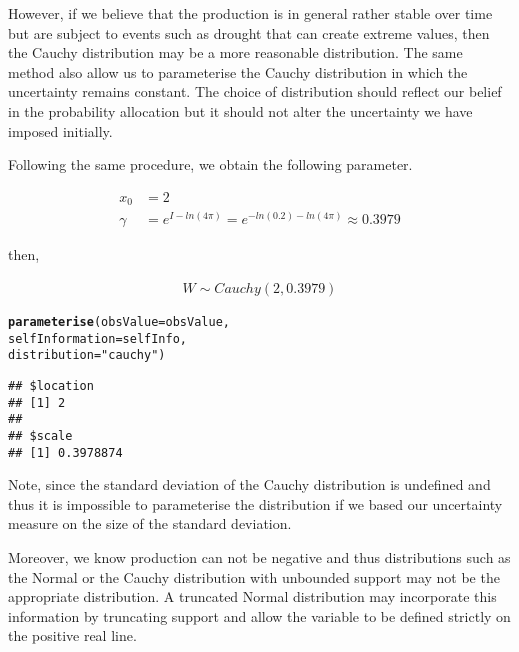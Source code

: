 \documentclass[nojss]{jss}\usepackage[]{graphicx}\usepackage[]{color}
\makeatletter
\newcommand{\hlstr}[1]{\textcolor[rgb]{0.192,0.494,0.8}{#1}}%
\newcommand{\hlstd}[1]{\textcolor[rgb]{0.345,0.345,0.345}{#1}}%
\newcommand{\hlkwc}[1]{\textcolor[rgb]{0.333,0.667,0.333}{#1}}%
\newcommand{\hlkwd}[1]{\textcolor[rgb]{0.737,0.353,0.396}{\textbf{#1}}}%
\newenvironment{kframe}{%
 \def\at@end@of@kframe{}%
 \ifinner\ifhmode%
  \def\at@end@of@kframe{\end{minipage}}%
  \begin{minipage}{\columnwidth}%
 \fi\fi%
 \def\FrameCommand##1{\hskip\@totalleftmargin \hskip-\fboxsep
 \colorbox{shadecolor}{##1}\hskip-\fboxsep
     \hskip-\linewidth \hskip-\@totalleftmargin \hskip\columnwidth}%
 \MakeFramed {\advance\hsize-\width
   \@totalleftmargin\z@ \linewidth\hsize
   \@setminipage}}%
 {\par\unskip\endMakeFramed%
 \at@end@of@kframe}
\newenvironment{knitrout}{}{} %
\makeatother
\begin{document}
However, if we believe that the production is in general rather stable
over time but are subject to events such as drought that can create
extreme values, then the Cauchy distribution may be a more reasonable
distribution. The same method also allow us to parameterise the Cauchy
distribution in which the uncertainty remains constant. The choice of
distribution should reflect our belief in the probability allocation
but it should not alter the uncertainty we have imposed initially.

Following the same procedure, we obtain the following parameter.


\begin{align}
  x_0 &= 2\nonumber\\ 
  \gamma &= e^{I - ln(4\pi)} = e^{-ln(0.2) - ln(4\pi)} \approx 0.3979\nonumber
\end{align}

then,

\begin{align}
  W \sim Cauchy(2, 0.3979)\nonumber
\end{align}



\begin{knitrout}
\color{fgcolor}\begin{kframe}
\begin{alltt}
\hlkwd{parameterise}\hlstd{(}\hlkwc{obsValue} \hlstd{= obsValue,}
             \hlkwc{selfInformation} \hlstd{= selfInfo,}
             \hlkwc{distribution} \hlstd{=} \hlstr{"cauchy"}\hlstd{)}
\end{alltt}
\begin{verbatim}
## $location
## [1] 2
## 
## $scale
## [1] 0.3978874
\end{verbatim}
\end{kframe}
\end{knitrout}

Note, since the standard deviation of the Cauchy distribution is
undefined and thus it is impossible to parameterise the distribution
if we based our uncertainty measure on the size of the standard
deviation.


Moreover, we know production can not be negative and thus
distributions such as the Normal or the Cauchy distribution with
unbounded support may not be the appropriate distribution. A truncated
Normal distribution may incorporate this information by truncating
support and allow the variable to be defined strictly on the positive
real line.
\end{document}

